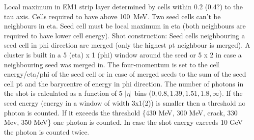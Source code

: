Local maximum in EM1 strip layer determined by cells within 0.2 (0.4?) to the
tau axis. Cells required to have above \SI{100}{\mega\electronvolt}. Two seed
cells can't be neighbours in eta. Seed cell must be local maximum in eta (both
neighbours are required to have lower cell energy). Shot construction: Seed
cells neighbouring a seed cell in phi direction are merged (only the highest pt
neighbour is merged). A cluster is built in a 5 (eta) x 1 (phi) window around
the seed or 5 x 2 in case a neighbouring seed was merged in. The four-momentum
is set to the cell energy/eta/phi of the seed cell or in case of merged seeds to
the sum of the seed cell pt and the barycentre of energy in phi direction. The
number of photons in the shot is calculated as a function of 5 $|\eta|$ bins
($0, 0.8, 1.39, 1.51, 1.8, \infty$). If the seed energy (energy in a window of
width 3x1(2)) is smaller then a threshold no photon is counted. If it exceeds
the threshold \{430 MeV, 300 MeV, crack, 330 Mev, 350 MeV\} one photon is
counted. In case the shot energy exceeds 10 GeV the photon is counted twice.


\cite{atlas:taurec:run1}
\cite{atlas:taurec:run2}
\cite{atlas:taurec:decaymodes}

